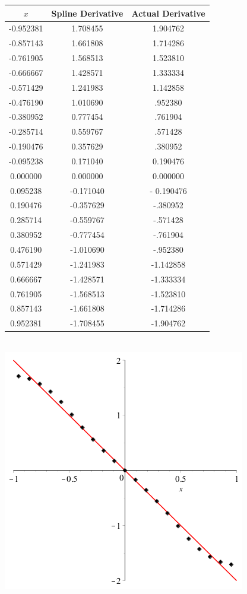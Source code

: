 \documentclass[11pt]{article} %
\begin{document}
\begin{tabular}{| c | c c |}
\hline
$x$ & Spline Derivative & Actual Derivative\\
\hline
-0.952381 & 1.708455 &  1.904762 \\
-0.857143 & 1.661808 &  1.714286\\
-0.761905 & 1.568513 &   1.523810\\
-0.666667 & 1.428571 &  1.333334  \\
-0.571429 & 1.241983 &  1.142858 \\
-0.476190 & 1.010690 &  .952380 \\
-0.380952 &  0.777454&  .761904 \\
-0.285714 & 0.559767 &  .571428  \\
-0.190476 & 0.357629 &   .380952 \\
-0.095238 & 0.171040 &   0.190476\\
0.000000 &  0.000000&   0.000000 \\
0.095238 & -0.171040 & - 0.190476\\
0.190476 & -0.357629 &  -.380952 \\
0.285714 & -0.559767&  -.571428\\
0.380952 & -0.777454&  -.761904 \\
0.476190 & -1.010690 & -.952380  \\
0.571429 &-1.241983 &   -1.142858\\
0.666667 & -1.428571  &  -1.333334 \\
0.761905 &-1.568513 & -1.523810  \\
0.857143 & -1.661808 & -1.714286   \\
0.952381 &-1.708455 & -1.904762  \\

\hline
\end{tabular} \\
\includegraphics[scale=1]{plots/deriv2plot.png}
\newpage
\end{document}
